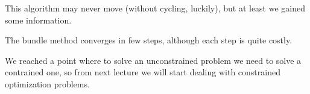 \documentclass[computational_mathematics.tex]{subfiles}
\begin{document}
This algorithm may never move (without cycling, luckily), but at least we gained some information.

The bundle method converges in few steps, although each step is quite costly.

We reached a point where to solve an unconstrained problem we need to solve a contrained one, so from next lecture we will start dealing with constrained optimization problems.
\end{document}
